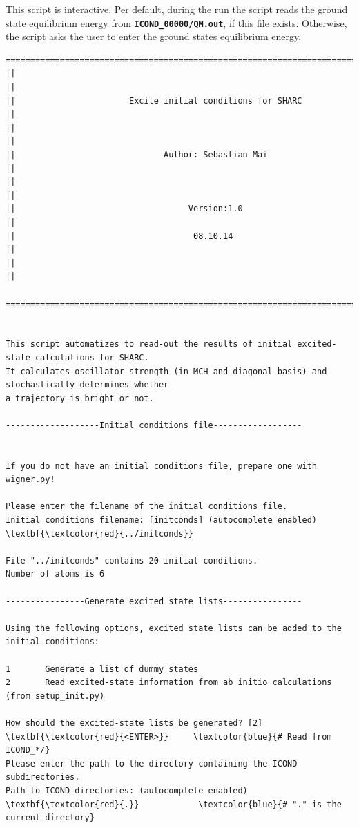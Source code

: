 \documentclass[a4paper,11pt,DIV=15,openany]{scrbook}
\newcommand{\ttt}[1]{\textbf{\texttt{#1}}}
\begin{document}
This script is interactive. 
Per default, during the run the script reads the ground state equilibrium energy from \ttt{ICOND\_00000/QM.out}, if this file exists. 
Otherwise, the script asks the user to enter the ground states equilibrium energy.

\begin{oframed}
\footnotesize\begin{Verbatim}[commandchars=\\\{\}]
  ================================================================================
||                                                                                ||
||                       Excite initial conditions for SHARC                      ||
||                                                                                ||
||                              Author: Sebastian Mai                             ||
||                                                                                ||
||                                   Version:1.0                                  ||
||                                    08.10.14                                    ||
||                                                                                ||
  ================================================================================


This script automatizes to read-out the results of initial excited-state calculations for SHARC.
It calculates oscillator strength (in MCH and diagonal basis) and stochastically determines whether
a trajectory is bright or not.
  
-------------------Initial conditions file------------------


If you do not have an initial conditions file, prepare one with wigner.py!

Please enter the filename of the initial conditions file.
Initial conditions filename: [initconds] (autocomplete enabled) \textbf{\textcolor{red}{../initconds}}

File "../initconds" contains 20 initial conditions.
Number of atoms is 6

----------------Generate excited state lists----------------

Using the following options, excited state lists can be added to the initial conditions:

1       Generate a list of dummy states
2       Read excited-state information from ab initio calculations (from setup_init.py)

How should the excited-state lists be generated? [2] \textbf{\textcolor{red}{<ENTER>}}     \textcolor{blue}{# Read from ICOND_*/}
Please enter the path to the directory containing the ICOND subdirectories.
Path to ICOND directories: (autocomplete enabled) \textbf{\textcolor{red}{.}}            \textcolor{blue}{# "." is the current directory}


\end{Verbatim}
\end{oframed}
\end{document}
